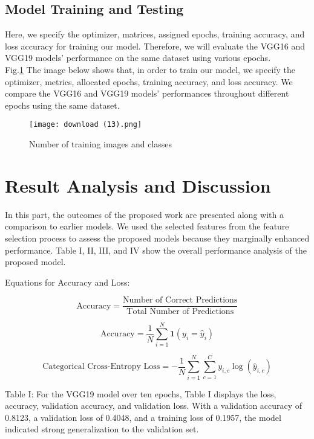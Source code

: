 \documentclass[conference]{IEEEtran}
\begin{document}
\subsection{Model Training and Testing}
Here, we specify the optimizer, matrices, assigned epochs, training accuracy, and loss accuracy for training our model. Therefore, we will evaluate the VGG16 and VGG19 models' performance on the same dataset using various epochs.\\

Fig.\ref{fig: Number of training images and classes} The image below shows that, in order to train our model, we specify the optimizer, metrics, allocated epochs, training accuracy, and loss accuracy. We compare the VGG16 and VGG19 models' performances throughout different epochs using the same dataset.

\begin{figure}[htp]
        \begin{center}
        \texttt{[image: download (13).png]}
        \end{center}
        \caption{Number of training images and classes}
        \label{fig: Number of training images and classes}
        \end{figure}
\section{Result Analysis and Discussion}
In this part, the outcomes of the proposed work are presented along with a comparison to earlier models. We used the selected features from the feature selection process to assess the proposed models because they marginally enhanced performance. Table I, II, III, and IV show the overall performance analysis of the proposed model.

Equations for Accuracy and Loss:

\[
\text{Accuracy} = \frac{\text{Number of Correct Predictions}}{\text{Total Number of Predictions}}
\]

\[
\text{Accuracy} = \frac{1}{N} \sum_{i=1}^{N} \mathbf{1}(y_i = \hat{y}_i)
\]

\[
\text{Categorical Cross-Entropy Loss} = -\frac{1}{N} \sum_{i=1}^{N} \sum_{c=1}^{C} y_{i,c} \log(\hat{y}_{i,c})
\]


Table I: For the VGG19 model over ten epochs, Table I displays the loss, accuracy, validation accuracy, and validation loss. With a validation accuracy of 0.8123, a validation loss of 0.4048, and a training loss of 0.1957, the model indicated strong generalization to the validation set.
\end{document}
